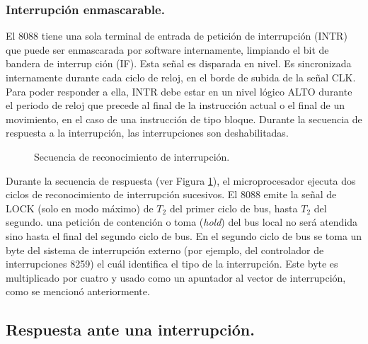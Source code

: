 
\subsubsection{Interrupci\'on enmascarable.}
\label{Subsubsection:INTR}

El 8088 tiene una sola terminal de entrada de petici\'on de in\-te\-rrup\-ci\-\'on (INTR) que %
puede ser enmascarada por software internamente, limpiando el bit de bandera de in\-te\-rrup\-%
ci\-\'on (IF). Esta se\~nal es disparada en nivel. Es sincronizada internamente durante cada %
ciclo de reloj, en el borde de subida de la se\~nal CLK. Para poder responder a ella, INTR debe %
estar en un nivel l\'ogico ALTO durante el periodo de reloj que precede al final de la %
instrucci\'on actual o el final de un movimiento, en el caso  de una instrucci\'on de tipo %
bloque. Durante la secuencia de respuesta a la in\-te\-rrup\-ci\-\'on, las interrupciones son %
deshabilitadas. 

\begin{figure}[!htb]
\vskip 5mm
\vskip 78mm
\caption{Secuencia de reconocimiento de interrupci\'on.} 
\label{Figura:SecuenciaDeInterrupcion}
\end{figure}

Durante la secuencia de respuesta (ver Figura \ref{Figura:SecuenciaDeInterrupcion}), el %
microprocesador ejecuta dos ciclos de reconocimiento de in\-te\-rrup\-ci\-\'on sucesivos. El %
8088 emite la se\~nal de LOCK (solo en modo m\'aximo) de $T_{2}$ del primer ciclo de bus, %
hasta $T_{2}$ del segundo. una petici\'on de contenci\'on o toma ({\it hold\/}) del bus local %
no ser\'a atendida sino hasta el final del segundo ciclo de bus. En el segundo ciclo de bus se %
toma un byte del sistema de in\-te\-rrup\-ci\-\'on externo (por ejemplo, del controlador de %
interrupciones 8259) el cu\'al identifica el tipo de la in\-te\-rrup\-ci\-\'on. Este byte es %
multiplicado por cuatro y usado como un apuntador al vector de in\-te\-rrup\-ci\-\'on, como se %
mencion\'o anteriormente.


\subsection{Respuesta ante una interrupci\'on.}
\label{Subsection:respuesta-a-int}


